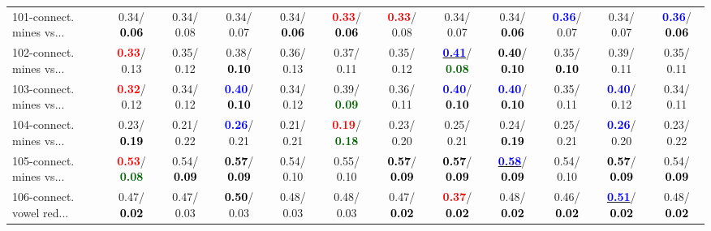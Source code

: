 \begin{table}[h]
\begin{center}
{\begin{tabular}{lc|c|c|c|c|c|c|c|c|c|c}
101-connect. mines vs... &   0.34/\textcolor{black}{\textbf{  0.06}} &   0.34/  0.08 &   0.34/  0.07 &   0.34/\textcolor{black}{\textbf{  0.06}} & \textcolor{red}{\textbf{  0.33}}/\textcolor{black}{\textbf{  0.06}} & \textcolor{red}{\textbf{  0.33}}/  0.08 &   0.34/  0.07 &   0.34/\textcolor{black}{\textbf{  0.06}} & \textcolor{blue}{\textbf{  0.36}}/  0.07 &   0.34/  0.07 & \textcolor{blue}{\textbf{  0.36}}/\textcolor{black}{\textbf{  0.06}} \\
102-connect. mines vs... & \textcolor{red}{\textbf{  0.33}}/  0.13 &   0.35/  0.12 &   0.38/\textcolor{black}{\textbf{  0.10}} &   0.36/  0.13 &   0.37/  0.11 &   0.35/  0.12 & \underline{\textcolor{blue}{\textbf{  0.41}}}/\textcolor{darkgreen}{\textbf{  0.08}} & \textcolor{black}{\textbf{  0.40}}/\textcolor{black}{\textbf{  0.10}} &   0.35/\textcolor{black}{\textbf{  0.10}} &   0.39/  0.11 &   0.35/  0.11 \\
103-connect. mines vs... & \textcolor{red}{\textbf{  0.32}}/  0.12 &   0.34/  0.12 & \textcolor{blue}{\textbf{  0.40}}/\textcolor{black}{\textbf{  0.10}} &   0.34/  0.12 &   0.39/\textcolor{darkgreen}{\textbf{  0.09}} &   0.36/  0.11 & \textcolor{blue}{\textbf{  0.40}}/\textcolor{black}{\textbf{  0.10}} & \textcolor{blue}{\textbf{  0.40}}/\textcolor{black}{\textbf{  0.10}} &   0.35/  0.11 & \textcolor{blue}{\textbf{  0.40}}/  0.12 &   0.34/  0.11 \\ \hline
104-connect. mines vs... &   0.23/\textcolor{black}{\textbf{  0.19}} &   0.21/  0.22 & \textcolor{blue}{\textbf{  0.26}}/  0.21 &   0.21/  0.21 & \textcolor{red}{\textbf{  0.19}}/\textcolor{darkgreen}{\textbf{  0.18}} &   0.23/  0.20 &   0.25/  0.21 &   0.24/\textcolor{black}{\textbf{  0.19}} &   0.25/  0.21 & \textcolor{blue}{\textbf{  0.26}}/  0.20 &   0.23/  0.22 \\
105-connect. mines vs... & \textcolor{red}{\textbf{  0.53}}/\textcolor{darkgreen}{\textbf{  0.08}} &   0.54/\textcolor{black}{\textbf{  0.09}} & \textcolor{black}{\textbf{  0.57}}/\textcolor{black}{\textbf{  0.09}} &   0.54/  0.10 &   0.55/  0.10 & \textcolor{black}{\textbf{  0.57}}/\textcolor{black}{\textbf{  0.09}} & \textcolor{black}{\textbf{  0.57}}/\textcolor{black}{\textbf{  0.09}} & \underline{\textcolor{blue}{\textbf{  0.58}}}/\textcolor{black}{\textbf{  0.09}} &   0.54/  0.10 & \textcolor{black}{\textbf{  0.57}}/\textcolor{black}{\textbf{  0.09}} &   0.54/\textcolor{black}{\textbf{  0.09}} \\
106-connect. vowel red... &   0.47/\textcolor{black}{\textbf{  0.02}} &   0.47/  0.03 & \textcolor{black}{\textbf{  0.50}}/  0.03 &   0.48/  0.03 &   0.48/  0.03 &   0.47/\textcolor{black}{\textbf{  0.02}} & \textcolor{red}{\textbf{  0.37}}/\textcolor{black}{\textbf{  0.02}} &   0.48/\textcolor{black}{\textbf{  0.02}} &   0.46/\textcolor{black}{\textbf{  0.02}} & \underline{\textcolor{blue}{\textbf{  0.51}}}/\textcolor{black}{\textbf{  0.02}} &   0.48/\textcolor{black}{\textbf{  0.02}} \\

\end{tabular}}
\end{center}
\end{table}
